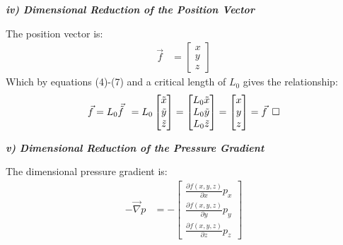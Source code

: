 \documentclass[titlepage]{article}
\begin{document}
    \begin{center}
        \textbf{\emph{iv) Dimensional Reduction of the Position Vector}}
    \end{center}
    The position vector is: 
    \begin{align}
        \vec{f} &= \begin{bmatrix}
            x \\
            y \\
            z 
        \end{bmatrix}
    \end{align}
    \noindent Which by equations (4)-(7) and a critical length of $L_{0}$ gives the relationship: 
    \begin{align}
        \vec{f}=L_{0}\vec{\tilde{f}}\hspace*{5pt}
        =L_{0}\begin{bmatrix}
            \tilde{x} \\
            \tilde{y} \\
            \tilde{z}
        \end{bmatrix}
        =\begin{bmatrix}
            L_{0}\tilde{x}\\
            L_{0}\tilde{y} \\
            L_{0}\tilde{z}
        \end{bmatrix}
        = \begin{bmatrix}
            x \\
            y \\
            z 
        \end{bmatrix}
        =\vec{f} \hspace*{5pt}\square
    \end{align}

    \begin{center}
        \textbf{\emph{v) Dimensional Reduction of the Pressure Gradient}}
    \end{center}

    \noindent The dimensional pressure gradient is:
    \begin{align}
        -\vec{\nabla}p &= -\begin{bmatrix}
            \displaystyle\frac{\partial{f\left(x,y,z\right)}}{\partial{x}}p_{x} \\[0.4cm]
            \displaystyle\frac{\partial{f\left(x,y,z\right)}}{\partial{y}}p_{y} \\[0.4cm]
            \displaystyle\frac{\partial{f\left(x,y,z\right)}}{\partial{z}}p_{z}
        \end{bmatrix}
    \end{align}
\end{document}
